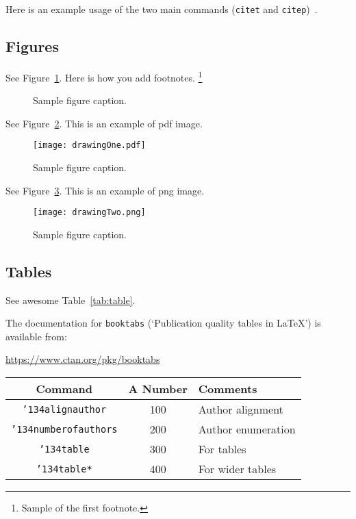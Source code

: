 \documentclass[clanek]{stucosrec}
\begin{document}
	Here is an example usage of the two main commands (\verb+citet+ and \verb+citep+)~\cite{vrbancic2019transfer}.
	
	\subsection{Figures}
	\lipsum[10]
	See Figure~\ref{fig:fig1}. Here is how you add footnotes. \footnote{Sample of the first footnote.}
	\lipsum[11]
	
	\begin{figure}[H]
		\centering
		\fbox{\rule[-.5cm]{4cm}{4cm} \rule[-.5cm]{4cm}{0cm}}
		\caption{Sample figure caption.}
		\label{fig:fig1}
	\end{figure}
	
	See Figure~\ref{fig:fig2}. This is an example of pdf image.
	
	\begin{figure}[b!]
		\centering
		\texttt{[image: drawingOne.pdf]}
		\caption{Sample figure caption.}
		\label{fig:fig2}
	\end{figure}
	
	See Figure~\ref{fig:fig3}. This is an example of png image.
	
	\begin{figure}[H]
		\centering
		\texttt{[image: drawingTwo.png]}
		\caption{Sample figure caption.}
		\label{fig:fig3}
	\end{figure}
	
	\subsection{Tables}
	See awesome Table~\ref{tab:table}.
	
	The documentation for \verb+booktabs+ (`Publication quality tables in LaTeX') is available from:
	\begin{center}
		\url{https://www.ctan.org/pkg/booktabs}
	\end{center}	
	
	\begin{table*}
		\centering
		\caption{Some Typical Commands}
		\label{tab:table}
		\begin{tabular}{|c|c|l|} \hline
			Command&A Number&Comments\\ \hline
			\texttt{{\char'134}alignauthor} & 100& Author alignment\\ \hline
			\texttt{{\char'134}numberofauthors}& 200& Author enumeration\\ \hline
			\texttt{{\char'134}table}& 300 & For tables\\ \hline
			\texttt{{\char'134}table*}& 400& For wider tables\\ \hline
		\end{tabular}
	\end{table*}
	
\end{document}
